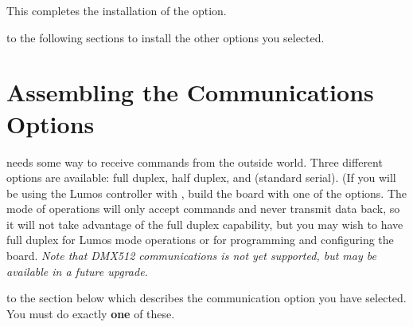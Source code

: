 \documentclass[letterpaper,twoside,onecolumn,openright,final]{memoir}
\begin{document}
This completes the installation of the  option.  

\bigskip

 to the following sections
to install the other options you selected.

\chapter{Assembling the Communications Options}\label{ch:comms}
 needs some way to receive commands from the outside
world.  Three different options are available:  full duplex,  half duplex, and 
(standard serial).  (If you will be using the Lumos controller with , build the
board with one of the  options.  The  mode of operations will only 
accept commands and never transmit data back, so it will not take advantage
of the full duplex capability, but you may wish to have full duplex for Lumos mode operations
or for programming and configuring the board.
\emph{Note that DMX512 communications is not yet supported, but may be available in a future upgrade.}

\bigskip

 to the section below which describes the communication option
you have selected.  You must do exactly {\bfseries one} of these.
\end{document}
